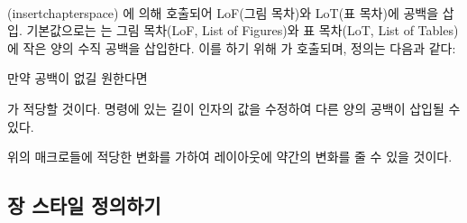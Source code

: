 
\begin{syntax}
\cmd{\insertchapterspace} \\
\end{syntax}
\glossary(insertchapterspace)%
  {}%
  {에 의해 호출되어 LoF(그림 목차)와 LoT(표 목차)에 공백을 삽입.}
기본값으로는 \cmd{\chapter}는 그림 목차(LoF, List of Figures)와
표 목차(LoT, List of Tables)에 작은 양의 수직 공백을 삽입한다.
이를 하기 위해 \cmd{\insertchapterspace}가 호출되며, 정의는 다음과 같다:
\begin{lcode}
\newcommand{\insertchapterspace}{%
  \addtocontents{lof}{\protect\addvspace{10pt}}%
  \addtocontents{lot}{\protect\addvspace{10pt}}%
}
\end{lcode}
만약 공백이 없길 원한다면
\begin{lcode}
\renewcommand{\insertchapterspace}{}
\end{lcode}
가 적당할 것이다.
\cmd{\addvspace} 명령에 있는 길이 인자의 값을 수정하여
다른 양의 공백이 삽입될 수 있다.

위의 매크로들에 적당한 변화를 가하여 레이아웃에 약간의 변화를 줄 수 있을 것이다.



\subsection{장 스타일 정의하기} \label{sec:chapterstyle}

